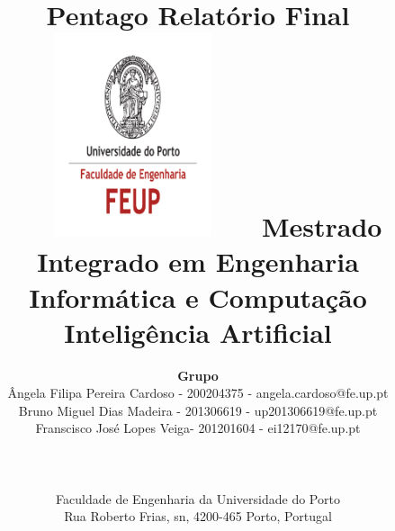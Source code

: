 



\setlength{\voffset}{0.6in}
\addtolength{\topmargin}{-.3in}
\setlength{\textwidth}{17cm}
\setlength{\textheight}{23cm}
\setlength{\parskip}{0.5em}

\title{
\Huge\textbf{Pentago}\linebreak\linebreak
\Large\textbf{Relatório Final}\linebreak\linebreak\linebreak
\includegraphics[height=6cm, width=7cm]{feup.pdf}\linebreak\linebreak
\Large{Mestrado Integrado em Engenharia Informática e Computação} \linebreak \linebreak
\Large{Inteligência Artificial}\linebreak\linebreak
}

\author{\textbf{Grupo}\\ 
Ângela Filipa Pereira Cardoso - 200204375 - angela.cardoso@fe.up.pt \\
Bruno Miguel Dias Madeira - 201306619 - up201306619@fe.up.pt \\
Franscisco José Lopes Veiga- 201201604 - ei12170@fe.up.pt \\\linebreak\linebreak \\ \\ 
 \\ Faculdade de Engenharia da Universidade do Porto \\ Rua Roberto Frias, s\/n, 4200-465 Porto, Portugal  \linebreak\linebreak\linebreak\linebreak
\linebreak\linebreak\vspace{1cm}}
\maketitle
 
